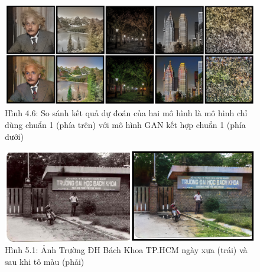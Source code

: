\documentclass[a4paper]{article}
\begin{document}
\begin{figure}[h!]
\centering
\includegraphics[width=14cm]{images/4_3.PNG}
\caption*{Hình 4.6: So sánh kết quả dự đoán của hai mô hình là mô hình chỉ dùng chuẩn 1 (phía trên) với mô hình GAN kết hợp chuẩn 1 (phía dưới)}
\end{figure}

\begin{figure}[h!]
\centering
\includegraphics[width=17cm]{images/5_1.PNG}
\caption*{Hình 5.1: Ảnh Trường ĐH Bách Khoa TP.HCM ngày xưa (trái) và sau khi tô màu (phải)}
\end{figure}

\clearpage
\end{document}
